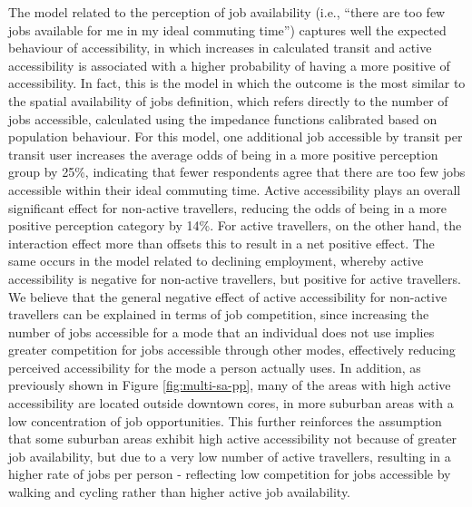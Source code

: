 \documentclass[preprint, 3p,
authoryear]{elsarticle} %
\begin{document}
The model related to the perception of job availability (i.e., ``there
are too few jobs available for me in my ideal commuting time'') captures
well the expected behaviour of accessibility, in which increases in
calculated transit and active accessibility is associated with a higher
probability of having a more positive of accessibility. In fact, this is
the model in which the outcome is the most similar to the spatial
availability of jobs definition, which refers directly to the number of
jobs accessible, calculated using the impedance functions calibrated
based on population behaviour. For this model, one additional job
accessible by transit per transit user increases the average odds of
being in a more positive perception group by 25\%, indicating that fewer
respondents agree that there are too few jobs accessible within their
ideal commuting time. Active accessibility plays an overall significant
effect for non-active travellers, reducing the odds of being in a more
positive perception category by 14\%. For active travellers, on the
other hand, the interaction effect more than offsets this to result in a
net positive effect. The same occurs in the model related to declining
employment, whereby active accessibility is negative for non-active
travellers, but positive for active travellers. We believe that the
general negative effect of active accessibility for non-active
travellers can be explained in terms of job competition, since
increasing the number of jobs accessible for a mode that an individual
does not use implies greater competition for jobs accessible through
other modes, effectively reducing perceived accessibility for the mode a
person actually uses. In addition, as previously shown in Figure
\ref{fig:multi-sa-pp}, many of the areas with high active accessibility
are located outside downtown cores, in more suburban areas with a low
concentration of job opportunities. This further reinforces the
assumption that some suburban areas exhibit high active accessibility
not because of greater job availability, but due to a very low number of
active travellers, resulting in a higher rate of jobs per person -
reflecting low competition for jobs accessible by walking and cycling
rather than higher active job availability.
\end{document}
